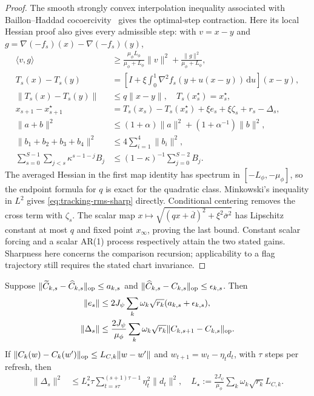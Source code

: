 \begin{proof}
The smooth strongly convex interpolation inequality associated with
Baillon--Haddad cocoercivity~\citep{bauschke2010baillon} gives the optimal-step
contraction. Here its local Hessian proof also gives every admissible step:
with $v=x-y$ and $g=\nabla(-f_s)(x)-\nabla(-f_s)(y)$,
\begin{align}
 \langle v,g\rangle&\ge\frac{\mu_\phi L_\phi}{\mu_\phi+L_\phi}\|v\|^2
                 +\frac{\|g\|^2}{\mu_\phi+L_\phi},\\
 T_s(x)-T_s(y)
 &=\left[I+\xi\int_0^1\nabla^2f_s(y+u(x-y))\,\mathrm du\right](x-y),\\
 \|T_s(x)-T_s(y)\|&\le q\|x-y\|,\quad T_s(x_s^\star)=x_s^\star,\\
 x_{s+1}-x_{s+1}^\star
 &=T_s(x_s)-T_s(x_s^\star)+\xi e_s+\xi\zeta_s+r_s-\Delta_s,\\
 \|a+b\|^2&\le(1+\alpha)\|a\|^2+(1+\alpha^{-1})\|b\|^2,\\
 \|b_1+b_2+b_3+b_4\|^2&\le4\sum_{i=1}^4\|b_i\|^2,\\
 \sum_{s=0}^{S-1}\sum_{j<s}\kappa^{s-1-j}B_j
 &\le(1-\kappa)^{-1}\sum_{j=0}^{S-2}B_j.
\end{align}
The averaged Hessian in the first map identity has spectrum in
$[-L_\phi,-\mu_\phi]$, so the endpoint formula for $q$ is exact for the
quadratic class. Minkowski's inequality in $L^2$ gives
\eqref{eq:tracking-rms-sharp} directly. Conditional centering removes the
cross term with $\zeta_s$. The scalar map
$x\mapsto\sqrt{(qx+\overline d)^2+\xi^2\overline\sigma^2}$ has Lipschitz constant at most
$q$ and fixed point $x_\infty$, proving the last bound. Constant scalar forcing
and a scalar AR(1) process respectively attain the two stated gains.
Sharpness here concerns the comparison recursion; applicability to a flag
trajectory still requires the stated chart invariance.
\end{proof}
\begin{corollary}\label{cor:rigid-flag-forcing}
Suppose $\|\widetilde C_{k,s}-\widehat C_{k,s}\|_{\mathrm{op}}\le a_{k,s}$ and
$\|\widehat C_{k,s}-C_{k,s}\|_{\mathrm{op}}\le\epsilon_{k,s}$. Then
\begin{align}
 \|e_s\|&\le2J_\psi\sum_k\omega_k\sqrt{r_k}(a_{k,s}+\epsilon_{k,s}),\\
 \|\Delta_s\|&\le\frac{2J_\psi}{\mu_\phi}
               \sum_k\omega_k\sqrt{r_k}\|C_{k,s+1}-C_{k,s}\|_{\mathrm{op}}.
\end{align}
If $\|C_k(w)-C_k(w')\|_{\mathrm{op}}\le L_{C,k}\|w-w'\|$ and
$w_{t+1}=w_t-\eta_t d_t$, with $\tau$ steps per refresh, then
\begin{align}
 \|\Delta_s\|^2
 &\le L_\star^2\tau\sum_{t=s\tau}^{(s+1)\tau-1}\eta_t^2\|d_t\|^2,
 \quad L_\star:=\frac{2J_\psi}{\mu_\phi}\sum_k\omega_k\sqrt{r_k}L_{C,k}.
\end{align}
\end{corollary}
